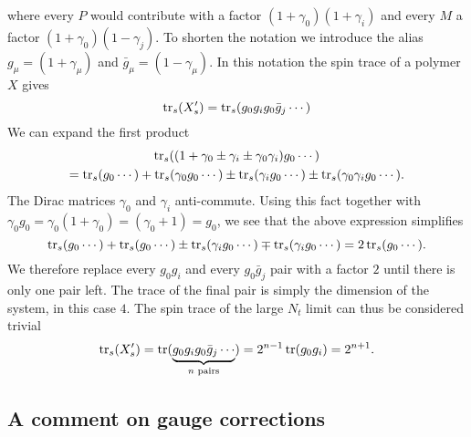 %
where every $P$ would contribute with a factor $(1+\gamma_0)(1+\gamma_i)$ and
every $M$ a factor $(1+\gamma_0)(1-\gamma_j)$. To shorten the notation we
introduce the alias $g_{\mu} = (1+\gamma_{\mu})$ and $\bar{g}_{\mu} =
(1-\gamma_{\mu})$. In this notation the spin trace of a polymer $X$ gives
%
\begin{equation}
  \operatorname{tr}_s (X'_s) = \operatorname{tr}_s(g_0 g_i g_0 \bar{g}_j \cdots)
\end{equation}
%
We can expand the first product
%
\begin{multline}
  \operatorname{tr}_s((1 + \gamma_0 \pm \gamma_i \pm \gamma_0 \gamma_i)g_0  \cdots) \\
    = \operatorname{tr}_s(g_0 \cdots) + \operatorname{tr}_s(\gamma_0g_0 \cdots)
    \pm \operatorname{tr}_s(\gamma_i g_0 \cdots) \pm \operatorname{tr}_s(\gamma_0\gamma_ig_0 \cdots).
\end{multline}
%
The Dirac matrices $\gamma_0$ and $\gamma_i$ anti-commute. Using this fact
together with $\gamma_0 g_0 = \gamma_0(1+\gamma_0) = (\gamma_0+1) = g_0$, we see
that the above expression simplifies
%
\begin{equation}
  \operatorname{tr}_s(g_0 \cdots) + \operatorname{tr}_s( g_0 \cdots )
    \pm \operatorname{tr}_s(\gamma_i g_0 \cdots ) \mp \operatorname{tr}_s(\gamma_i g_0 \cdots )
    = 2 \operatorname{tr}_s( g_0 \cdots ) .
\end{equation}
%
We therefore replace every $g_0 g_i$ and every $g_0 \bar{g}_j$ pair with a
factor $2$ until there is only one pair left. The trace of the final pair is
simply the dimension of the system, in this case $4$. The spin trace of the
large $N_t$ limit can thus be considered trivial
%
\begin{equation}
  \operatorname{tr}_s(X'_s) = \operatorname{tr} ( \underbrace{g_0 g_i g_0 \bar{g}_j \cdots}_{n \text{ pairs}})
   = 2^{n-1} \operatorname{tr}(g_0 g_i) = 2^{n+1}.
\end{equation}

\subsection{A comment on gauge corrections} \label{sec:gauge_comment}

